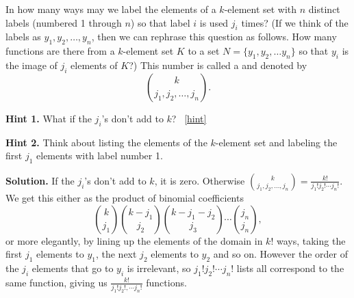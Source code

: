 \documentclass{book}
\begin{document}
\setcounter{project}{281}
\addtocounter{project}{-1}
\begin{activity}[]\label{activity-274}
\hypertarget{p-1455}{}%
In how many ways may we label the elements of a \(k\)-element set with \(n\) distinct labels (numbered 1 through \(n\)) so that label \(i\) is used \(j_i\) times? (If we think of the labels as \(y_1, y_2, \ldots, y_n\), then we can rephrase this question as follows.  How many functions are there from a \(k\)-element set \(K\) to a set \(N=\{y_1,y_2,\ldots y_n\}\) so that \(y_i\) is the image of \(j_i\) elements of \(K\)?) This number is called a  and denoted by%
\begin{equation*}
\binom{k}{j_1,j_2,\ldots, j_n}.
\end{equation*}
%
\par\smallskip%
\noindent\textbf{Hint 1.}\hypertarget{hint-182}{}\quad%
\hypertarget{p-1456}{}%
What if the \(j_i\)'s don't add to \(k\)?%
~\hfill{\tiny\hyperlink{a-281}{[hint]}\hypertarget{q-281}{}}\par\smallskip%
\noindent\textbf{Hint 2.}\hypertarget{hint-183}{}\quad%
\hypertarget{p-1457}{}%
Think about listing the elements of the \(k\)-element set and labeling the first \(j_1\) elements with label number 1.%
\par\smallskip%
\noindent\textbf{Solution.}\hypertarget{solution-194}{}\quad%
\hypertarget{p-1458}{}%
If the \(j_i\)'s don't add to \(k\), it is zero.  Otherwise \(\binom{k}{j_1,j_2,\ldots, j_n} =
\frac{k!}{j_1!j_2!\cdots j_n!}\). We get this either as the product of binomial coefficients%
\begin{equation*}
\binom{k}{j_1}\binom{k-j_1}{j_2}\binom{k-j_1-j_2}{j_3}\cdots\binom{j_n}{j_n},
\end{equation*}
or more elegantly, by lining up the elements of the domain in \(k!\) ways, taking the first \(j_1\) elements to \(y_1\), the next \(j_2\) elements to \(y_2\) and so on.  However the order of the \(j_i\) elements that go to \(y_i\) is irrelevant, so \(j_1!j_2!\cdots j_n!\) lists all correspond to the same function, giving us \(\frac{k!}{j_1!j_2!,\cdots j_n!}\) functions.%
\end{activity}
\end{document}
